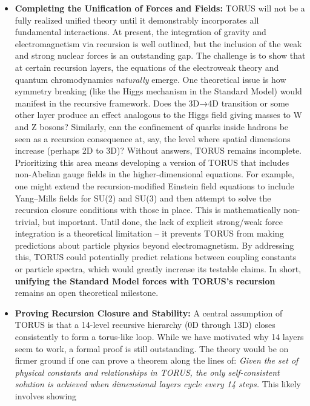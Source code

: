 \documentclass[
]{article}
\begin{document}
{\begin{itemize}
\item
  \textbf{Completing the Unification of Forces and Fields:} TORUS will
  not be a fully realized unified theory until it demonstrably
  incorporates all fundamental interactions. At present, the integration
  of gravity and electromagnetism via recursion is well outlined, but
  the inclusion of the weak and strong nuclear forces is an outstanding
  gap\hspace{0pt}. The challenge is to show that at certain recursion
  layers, the equations of the electroweak theory and quantum
  chromodynamics \emph{naturally} emerge. One theoretical issue is how
  symmetry breaking (like the Higgs mechanism in the Standard Model)
  would manifest in the recursive framework. Does the 3D→4D transition
  or some other layer produce an effect analogous to the Higgs field
  giving masses to W and Z bosons? Similarly, can the confinement of
  quarks inside hadrons be seen as a recursion consequence at, say, the
  level where spatial dimensions increase (perhaps 2D to 3D)? Without
  answers, TORUS remains incomplete. Prioritizing this area means
  developing a version of TORUS that includes non-Abelian gauge fields
  in the higher-dimensional equations. For example, one might extend the
  recursion-modified Einstein field equations to include Yang--Mills
  fields for SU(2) and SU(3) and then attempt to solve the recursion
  closure conditions with those in place. This is mathematically
  non-trivial, but important. Until done, the lack of explicit
  strong/weak force integration is a theoretical limitation -- it
  prevents TORUS from making predictions about particle physics beyond
  electromagnetism. By addressing this, TORUS could potentially predict
  relations between coupling constants or particle spectra, which would
  greatly increase its testable claims. In short, \textbf{unifying the
  Standard Model forces with TORUS's recursion} remains an open
  theoretical milestone.
\item
  \textbf{Proving Recursion Closure and Stability:} A central assumption
  of TORUS is that a 14-level recursive hierarchy (0D through 13D)
  closes consistently to form a torus-like loop. While we have motivated
  why 14 layers seem to work, a formal proof is still outstanding. The
  theory would be on firmer ground if one can prove a theorem along the
  lines of: \emph{Given the set of physical constants and relationships
  in TORUS, the only self-consistent solution is achieved when
  dimensional layers cycle every 14 steps.} This likely involves showing

\end{itemize}}
\end{document}
